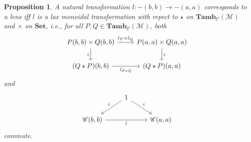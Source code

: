 \documentclass[11pt,a4paper]{amsart}
\theoremstyle{plain}
\newtheorem{proposition}[theorem]{Proposition}
\theoremstyle{definition}
\newcommand{\C}{\mathscr{C}}
\newcommand{\M}{\mathscr{M}}
\newcommand{\Set}{\mathbf{Set}}
\newcommand{\Tamb}{\mathbf{Tamb}}
\begin{document}
\begin{proposition}
A natural transformation 
$l : -(b, b) \to -(a, a)$ corresponds to a lens iff $l$ is a lax monoidal transformation with repect to $\star$ on $\Tamb_\C(\M)$ and $\times$ on $\Set$, i.e., for all $P, Q \in \Tamb_\C(\M)$, both 
\[
\begin{tikzcd}
P(b, b) \times Q(b, b) \ar[d, "i"left ] \ar[r, "l_P \times l_Q" above] & P(a, a) \times Q(a, a) \ar[d, "i"] \\
(Q\star P)(b, b) \ar[r, "l_{P \star Q}" below]  & (Q\star P)(a, a)
\end{tikzcd}
\]
and
\[
\begin{tikzcd}
& 1 \ar[dl, "i" above left] \ar[dr, "i"] \\
\C(b,b) \ar[rr, "l" below] & &\C(a,a)
\end{tikzcd}
\]
commute.
\end{proposition}
\end{document}
